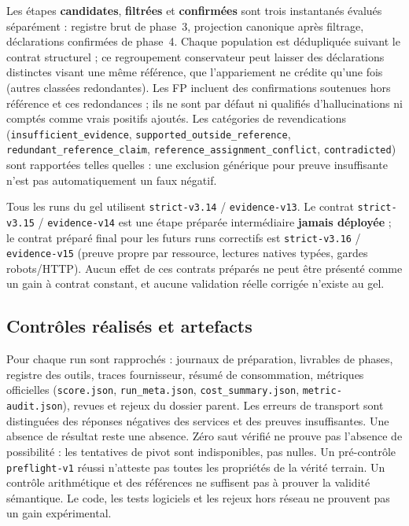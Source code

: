 \documentclass[11pt,a4paper]{article}
\newcommand{\code}[1]{{\urlstyle{tt}\nolinkurl{#1}}}
\begin{document}
Les \'etapes \textbf{candidates}, \textbf{filtr\'ees} et \textbf{confirm\'ees} sont trois instantan\'es \'evalu\'es s\'epar\'ement : registre brut de phase~3, projection canonique apr\`es filtrage, d\'eclarations confirm\'ees de phase~4. Chaque population est d\'edupliqu\'ee suivant le contrat structurel ; ce regroupement conservateur peut laisser des d\'eclarations distinctes visant une m\^eme r\'ef\'erence, que l'appariement ne cr\'edite qu'une fois (autres class\'ees redondantes). Les FP incluent des confirmations soutenues hors r\'ef\'erence et ces redondances ; ils ne sont par d\'efaut ni qualifi\'es d'hallucinations ni compt\'es comme vrais positifs ajout\'es. Les cat\'egories de revendications (\code{insufficient_evidence}, \code{supported_outside_reference}, \code{redundant_reference_claim}, \code{reference_assignment_conflict}, \code{contradicted}) sont rapport\'ees telles quelles : une exclusion g\'en\'erique pour preuve insuffisante n'est pas automatiquement un faux n\'egatif.

Tous les runs du gel utilisent \code{strict-v3.14} / \code{evidence-v13}. Le contrat \code{strict-v3.15} / \code{evidence-v14} est une \'etape pr\'epar\'ee interm\'ediaire \textbf{jamais d\'eploy\'ee} ; le contrat pr\'epar\'e final pour les futurs runs correctifs est \code{strict-v3.16} / \code{evidence-v15} (preuve propre par ressource, lectures natives typ\'ees, gardes robots/HTTP). Aucun effet de ces contrats pr\'epar\'es ne peut \^etre pr\'esent\'e comme un gain \`a contrat constant, et aucune validation r\'eelle corrig\'ee n'existe au gel.

\subsection{Contr\^oles r\'ealis\'es et artefacts}
Pour chaque run sont rapproch\'es : journaux de pr\'eparation, livrables de phases, registre des outils, traces fournisseur, r\'esum\'e de consommation, m\'etriques officielles (\code{score.json}, \code{run_meta.json}, \code{cost_summary.json}, \code{metric-audit.json}), revues et rejeux du dossier parent. Les erreurs de transport sont distingu\'ees des r\'eponses n\'egatives des services et des preuves insuffisantes. Une absence de r\'esultat reste une absence. Z\'ero saut v\'erifi\'e ne prouve pas l'absence de possibilit\'e : les tentatives de pivot sont indisponibles, pas nulles. Un pr\'e-contr\^ole \code{preflight-v1} r\'eussi n'atteste pas toutes les propri\'et\'es de la v\'erit\'e terrain. Un contr\^ole arithm\'etique et des r\'ef\'erences ne suffisent pas \`a prouver la validit\'e s\'emantique. Le code, les tests logiciels et les rejeux hors r\'eseau ne prouvent pas un gain exp\'erimental.
\end{document}

